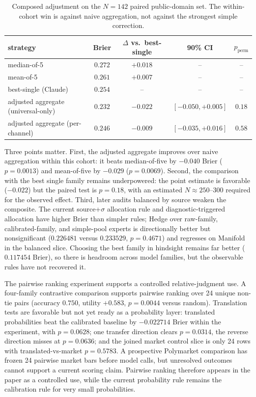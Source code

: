 \documentclass[11pt]{article}
\begin{document}
\begin{table}[htbp]
\centering
\small
\begin{tabular}{l c c c c}
\toprule
strategy & Brier & $\Delta$ vs.\ best-single & 90\% CI & $p_{\mathrm{perm}}$ \\
\midrule
median-of-5             & $0.272$ & $+0.018$ & -- & -- \\
mean-of-5               & $0.261$ & $+0.007$ & -- & -- \\
best-single (Claude)    & $0.254$ & --      & -- & -- \\
adjusted aggregate (universal-only) & $0.232$ & $-0.022$ & $[-0.050, +0.005]$ & $0.18$ \\
adjusted aggregate (per-channel)    & $0.246$ & $-0.009$ & $[-0.035, +0.016]$ & $0.58$ \\
\bottomrule
\end{tabular}
\caption{Composed adjustment on the \(N=142\) paired public-domain set. The within-cohort win is against naive aggregation, not against the strongest simple correction.}
\label{tab:composed-adjustment}
\end{table}

Three points matter. First, the adjusted aggregate improves over naive aggregation within this cohort: it beats median-of-five by \(-0.040\) Brier (\(p=0.0013\)) and mean-of-five by \(-0.029\) (\(p=0.0069\)). Second, the comparison with the best single family remains underpowered: the point estimate is favorable (\(-0.022\)) but the paired test is \(p=0.18\), with an estimated \(N\approx250\)--\(300\) required for the observed effect. Third, later audits balanced by source weaken the composite. The current source+\(\sigma\) allocation rule and diagnostic-triggered allocation have higher Brier than simpler rules; Hedge over raw-family, calibrated-family, and simple-pool experts is directionally better but nonsignificant (\(0.226481\) versus \(0.233529\), \(p=0.4671\)) and regresses on Manifold in the balanced slice. Choosing the best family in hindsight remains far better (\(0.117454\) Brier), so there is headroom across model families, but the observable rules have not recovered it.

The pairwise ranking experiment supports a controlled relative-judgment use. A four-family contrastive comparison supports pairwise ranking over 24 unique non-tie pairs (accuracy \(0.750\), utility \(+0.583\), \(p=0.0044\) versus random). Translation tests are favorable but not yet ready as a probability layer: translated probabilities beat the calibrated baseline by \(-0.022714\) Brier within the experiment, with \(p=0.0628\); one transfer direction clears \(p=0.0314\), the reverse direction misses at \(p=0.0636\); and the joined market control slice is only 24 rows with translated-vs-market \(p=0.5783\). A prospective Polymarket comparison has frozen 24 pairwise market bars before model calls, but unresolved outcomes cannot support a current scoring claim. Pairwise ranking therefore appears in the paper as a controlled use, while the current probability rule remains the calibration rule for very small probabilities.
\end{document}
